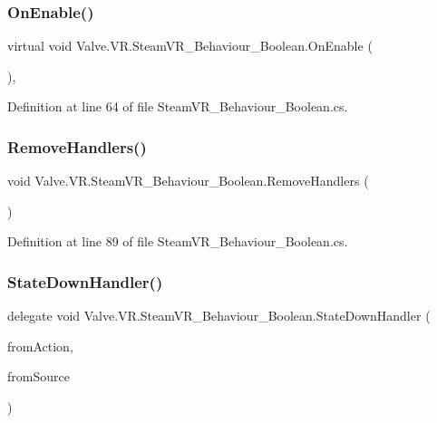 \subsubsection{\texorpdfstring{OnEnable()}{OnEnable()}}
{\footnotesize\ttfamily virtual void Valve.\+V\+R.\+Steam\+V\+R\+\_\+\+Behaviour\+\_\+\+Boolean.\+On\+Enable (\begin{DoxyParamCaption}{ }\end{DoxyParamCaption})\hspace{0.3cm}{\ttfamily [protected]}, {\ttfamily [virtual]}}



Definition at line 64 of file Steam\+V\+R\+\_\+\+Behaviour\+\_\+\+Boolean.\+cs.

\mbox{\label{class_valve_1_1_v_r_1_1_steam_v_r___behaviour___boolean_a5045745f25bd2a4ad2238782b551da5e}} 
\subsubsection{\texorpdfstring{RemoveHandlers()}{RemoveHandlers()}}
{\footnotesize\ttfamily void Valve.\+V\+R.\+Steam\+V\+R\+\_\+\+Behaviour\+\_\+\+Boolean.\+Remove\+Handlers (\begin{DoxyParamCaption}{ }\end{DoxyParamCaption})\hspace{0.3cm}{\ttfamily [protected]}}



Definition at line 89 of file Steam\+V\+R\+\_\+\+Behaviour\+\_\+\+Boolean.\+cs.

\mbox{\label{class_valve_1_1_v_r_1_1_steam_v_r___behaviour___boolean_a72b8998f8432175c0bdeec28b33eeb48}} 
\subsubsection{\texorpdfstring{StateDownHandler()}{StateDownHandler()}}
{\footnotesize\ttfamily delegate void Valve.\+V\+R.\+Steam\+V\+R\+\_\+\+Behaviour\+\_\+\+Boolean.\+State\+Down\+Handler (\begin{DoxyParamCaption}\item[{\mbox{\hyperlink{class_valve_1_1_v_r_1_1_steam_v_r___behaviour___boolean}{Steam\+V\+R\+\_\+\+Behaviour\+\_\+\+Boolean}}}]{from\+Action,  }\item[{\mbox{\hyperlink{namespace_valve_1_1_v_r_a82e5bf501cc3aa155444ee3f0662853f}{Steam\+V\+R\+\_\+\+Input\+\_\+\+Sources}}}]{from\+Source }\end{DoxyParamCaption})}

